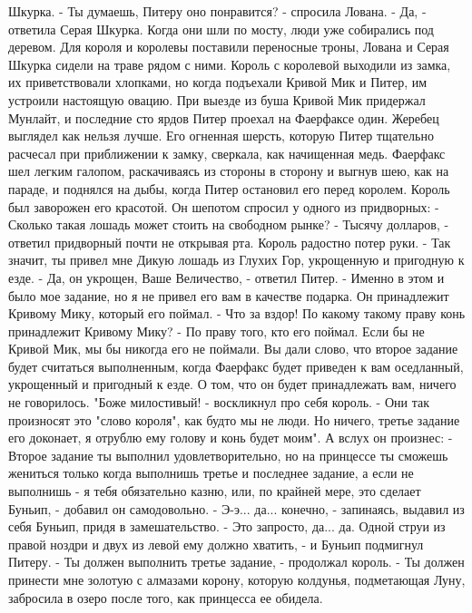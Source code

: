Шкурка.
    - Ты думаешь, Питеру оно понравится? - спросила Лована.
    - Да, - ответила Серая Шкурка.
    Когда они шли по мосту, люди уже собирались под деревом. Для 
короля и королевы поставили переносные троны, Лована и Серая Шкурка 
сидели на траве рядом с ними. Король с королевой выходили из замка, их 
приветствовали хлопками, но когда подъехали Кривой Мик и Питер, им 
устроили настоящую овацию.
    При выезде из буша Кривой Мик придержал Мунлайт, и последние сто 
ярдов Питер проехал на Фаерфаксе один. Жеребец выглядел как нельзя 
лучше. Его огненная шерсть, которую Питер тщательно расчесал при 
приближении к замку, сверкала, как начищенная медь. Фаерфакс шел 
легким галопом, раскачиваясь из стороны в сторону и выгнув шею, как на 
параде, и поднялся на дыбы, когда Питер остановил его перед королем. 
Король был заворожен его красотой. Он шепотом спросил у одного из 
придворных:
    - Сколько такая лошадь может стоить на свободном рынке?
    - Тысячу долларов, - ответил придворный почти не открывая рта. 
Король радостно потер руки.
    - Так значит, ты привел мне Дикую лошадь из Глухих Гор, укрощенную 
и пригодную к езде.
    - Да, он укрощен, Ваше Величество, - ответил Питер. - Именно в 
этом и было мое задание, но я не привел его вам в качестве подарка. Он 
принадлежит Кривому Мику, который его поймал.
    - Что за вздор! По какому такому праву конь принадлежит Кривому 
Мику?
    - По праву того, кто его поймал. Если бы не Кривой Мик, мы бы 
никогда его не поймали. Вы дали слово, что второе задание будет 
считаться выполненным, когда Фаерфакс будет приведен к вам оседланный, 
укрощенный и пригодный к езде. О том, что он будет принадлежать вам, 
ничего не говорилось.
    "Боже милостивый! - воскликнул про себя король. - Они так 
произносят это "слово короля", как будто мы не люди. Но ничего, третье 
задание его доконает, я отрублю ему голову и конь будет моим".
    А вслух он произнес:
    - Второе задание ты выполнил удовлетворительно, но на принцессе ты 
сможешь жениться только когда выполнишь третье и последнее задание, а 
если не выполнишь - я тебя обязательно казню, или, по крайней мере, 
это сделает Буньип, - добавил он самодовольно.
    - Э-э... да... конечно, - запинаясь, выдавил из себя Буньип, придя 
в замешательство. - Это запросто, да... да. Одной струи из правой 
ноздри и двух из левой ему должно хватить, - и Буньип подмигнул 
Питеру.
    - Ты должен выполнить третье задание, - продолжал король. - Ты 
должен принести мне золотую с алмазами корону, которую колдунья, 
подметающая Луну, забросила в озеро после того, как принцесса ее 
обидела.

